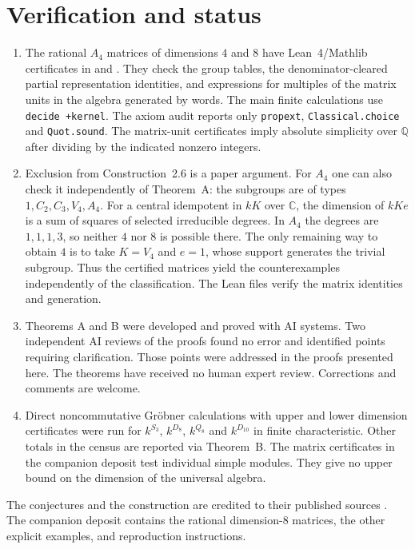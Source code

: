 \documentclass[11pt]{amsart}
\theoremstyle{definition}
\newcommand{\Q}{\mathbb Q}
\newcommand{\C}{\mathbb C}
\begin{document}
\section{Verification and status}
\begin{enumerate}
\sloppy
\item The rational $A_4$ matrices of dimensions $4$ and $8$ have Lean~4/Mathlib certificates in  and . They check the group tables, the denominator-cleared partial representation identities, and expressions for multiples of the matrix units in the algebra generated by words. The main finite calculations use \texttt{decide +kernel}. The axiom audit reports only \texttt{propext}, \texttt{Classical.choice} and \texttt{Quot.sound}. The matrix-unit certificates imply absolute simplicity over $\Q$ after dividing by the indicated nonzero integers.
\item Exclusion from Construction~2.6 is a paper argument. For $A_4$ one can also check it independently of Theorem~A: the subgroups are of types $1,C_2,C_3,V_4,A_4$. For a central idempotent in $kK$ over $\C$, the dimension of $kK e$ is a sum of squares of selected irreducible degrees. In $A_4$ the degrees are $1,1,1,3$, so neither $4$ nor $8$ is possible there. The only remaining way to obtain $4$ is to take $K=V_4$ and $e=1$, whose support generates the trivial subgroup. Thus the certified matrices yield the counterexamples independently of the classification. The Lean files verify the matrix identities and generation.
\item Theorems A and B were developed and proved with AI systems. Two independent AI reviews of the proofs found no error and identified points requiring clarification. Those points were addressed in the proofs presented here. The theorems have received no human expert review. Corrections and comments are welcome.
\item Direct noncommutative Gr\"obner calculations with upper and lower dimension certificates were run for $k^{S_3}$, $k^{D_8}$, $k^{Q_8}$ and $k^{D_{10}}$ in finite characteristic. Other totals in the census are reported via Theorem~B. The matrix certificates in the companion deposit test individual simple modules. They give no upper bound on the dimension of the universal algebra.
\end{enumerate}
The conjectures and the construction are credited to their published sources \cite{ABV19,BHSV,H}. The companion deposit contains the rational dimension-$8$ matrices, the other explicit examples, and reproduction instructions.
\end{document}
